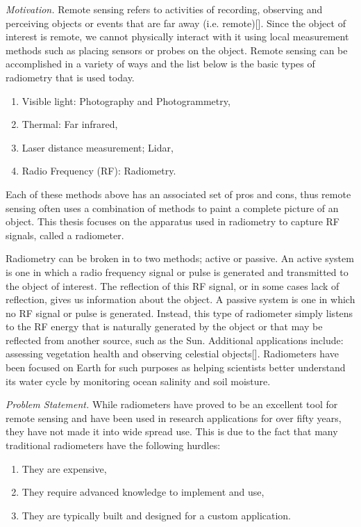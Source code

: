 \emph{Motivation.}  Remote sensing refers to activities of recording, observing and perceiving objects or events that are far away (i.e. remote)[\cite{weng2012}].  Since the object of interest is remote, we cannot physically interact with it using local measurement methods such as placing sensors or probes on the object.  Remote sensing can be accomplished in a variety of ways and the list below is the basic types of radiometry that is used today.

\begin{enumerate}
\item Visible light: Photography and Photogrammetry,
\item Thermal: Far infrared,
\item Laser distance measurement; Lidar,
\item Radio Frequency (RF): Radiometry.
\end{enumerate}

Each of these methods above has an associated set of pros and cons, thus remote sensing often uses a combination of methods to paint a complete picture of an object.  This thesis focuses on the apparatus used in radiometry to capture RF signals, called a radiometer.

Radiometry can be broken in to two methods; active or passive.  An active system is one in which a radio frequency signal or pulse is generated and transmitted to the object of interest.  The reflection of this RF signal, or in some cases lack of reflection, gives us information about the object.  A passive system is one in which no RF signal or pulse is generated.  Instead, this type of radiometer simply listens to the RF energy that is naturally generated by the object or that may be reflected from another source, such as the Sun.  Additional applications include: assessing vegetation health and observing celestial objects[\cite{ulaby2014}].  Radiometers have been focused on Earth for such purposes as helping scientists better understand its water cycle by monitoring ocean salinity and soil moisture.  

\emph{Problem Statement.}  While radiometers have proved to be an excellent tool for remote sensing and have been used in research applications for over fifty years, they have not made it into wide spread use.  This is due to the fact that many traditional radiometers have the following hurdles:

\begin{enumerate}
\item They are expensive,
\item They require advanced knowledge to implement and use,
\item They are typically built and designed for a custom application.
\end{enumerate}

